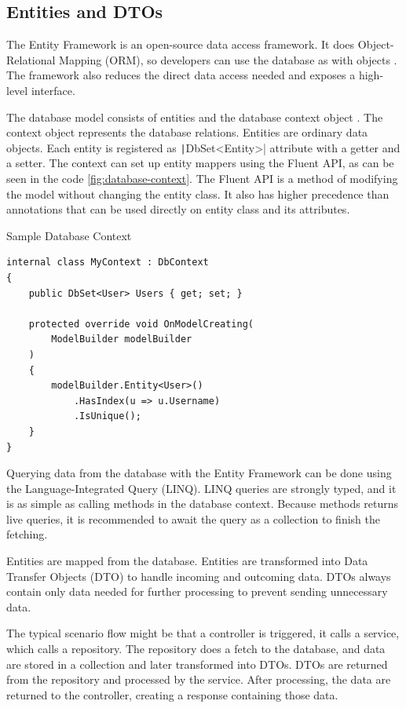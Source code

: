 \subsection{Entities and DTOs}

The Entity Framework is an open-source data access framework.
It does Object-Relational Mapping (ORM), so developers can use the database as with objects \cite{a2021_overview}.
The framework also reduces the direct data access needed and exposes a high-level interface.

The database model consists of entities and the database context object \cite{a2022_creating}.
The context object represents the database relations.
Entities are ordinary data objects.
Each entity is registered as \texttt|DbSet<Entity>| attribute with a getter and a setter.
The context can set up entity mappers using the Fluent API, as can be seen in the code \ref{fig:database-context}.
The Fluent API is a method of modifying the model without changing the entity class.
It also has higher precedence than annotations that can be used directly on entity class and its attributes.

\begin{listing}
    \caption{Sample Database Context}
    \label{fig:database-context}
    \begin{verbatim}
internal class MyContext : DbContext
{
    public DbSet<User> Users { get; set; }

    protected override void OnModelCreating(
        ModelBuilder modelBuilder
    )
    {
        modelBuilder.Entity<User>()
            .HasIndex(u => u.Username)
            .IsUnique();
    }
}
    \end{verbatim}
\end{listing}

Querying data from the database with the Entity Framework can be done using the Language-Integrated Query (LINQ).
LINQ queries are strongly typed, and it is as simple as calling methods in the database context.
Because methods returns live queries, it is recommended to await the query as a collection to finish the fetching.

Entities are mapped from the database.
Entities are transformed into Data Transfer Objects (DTO) to handle incoming and outcoming data.
DTOs always contain only data needed for further processing to prevent sending unnecessary data.

The typical scenario flow might be that a controller is triggered, it calls a service, which calls a repository.
The repository does a fetch to the database, and data are stored in a collection and later transformed into DTOs.
DTOs are returned from the repository and processed by the service.
After processing, the data are returned to the controller, creating a response containing those data.

